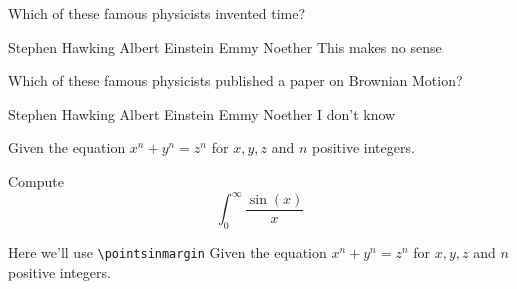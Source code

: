 \documentclass[addpoints]{exam}
\begin{document}
\begin{questions}
\question Which of these famous physicists invented time?

  \begin{oneparchoices}
  \choice Stephen Hawking 
  \choice Albert Einstein
  \choice Emmy Noether
  \choice This makes no sense
  \end{oneparchoices}
  
\question Which of these famous physicists published a paper on Brownian Motion?

  \begin{checkboxes}
  \choice Stephen Hawking 
  \choice Albert Einstein
  \choice Emmy Noether
  \choice I don't know
  \end{checkboxes}


\question Given the equation \(x^n + y^n = z^n\) for \(x,y,z\) and \(n\) positive
  integers. 

\question[20] Compute \[\int_{0}^{\infty} \frac{\sin(x)}{x}\]


Here we'll use \verb|\pointsinmargin|
\pointsinmargin
\question Given the equation \(x^n + y^n = z^n\) for \(x,y,z\) and \(n\) positive
integers. 
\end{questions}
\end{document}
